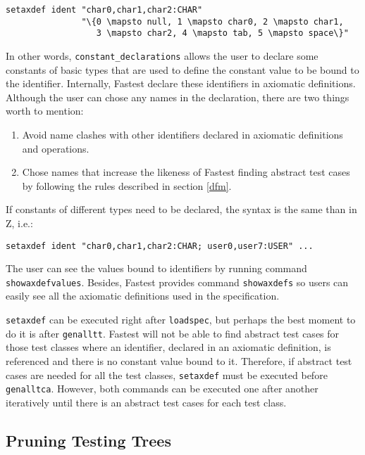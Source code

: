 \begin{verbatim}
setaxdef ident "char0,char1,char2:CHAR" 
               "\{0 \mapsto null, 1 \mapsto char0, 2 \mapsto char1, 
                  3 \mapsto char2, 4 \mapsto tab, 5 \mapsto space\}"
\end{verbatim}

In other words, \verb+constant_declarations+ allows the user to declare some constants of basic types that are used to define the constant value to be bound to the identifier. Internally, Fastest declare these identifiers in axiomatic definitions. Although the user can chose any names in the declaration, there are two things worth to mention:

\begin{enumerate}
\item Avoid name clashes with other identifiers declared in axiomatic definitions and operations.

\item Chose names that increase the likeness of Fastest finding abstract test cases by following the rules described in section \ref{dfm}.
\end{enumerate}

If constants of different types need to be declared, the syntax is the same than in Z, i.e.:

\begin{verbatim}
setaxdef ident "char0,char1,char2:CHAR; user0,user7:USER" ...
\end{verbatim}

The user can see the values bound to identifiers by running  command \verb+showaxdefvalues+. Besides, Fastest provides command \verb+showaxdefs+ so users can easily see all the axiomatic definitions used in the specification.

\verb+setaxdef+ can be executed right after \verb+loadspec+, but perhaps the best moment to do it is after \verb+genalltt+. Fastest will not be able to find abstract test cases for those test classes where an identifier, declared in an axiomatic definition, is referenced and there is no constant value bound to it. Therefore, if abstract test cases are needed for all the test classes, \verb+setaxdef+ must be executed before \verb+genalltca+. However, both commands can be executed one after another iteratively until there is an abstract test cases for each test class.


\subsection{Pruning Testing Trees}


